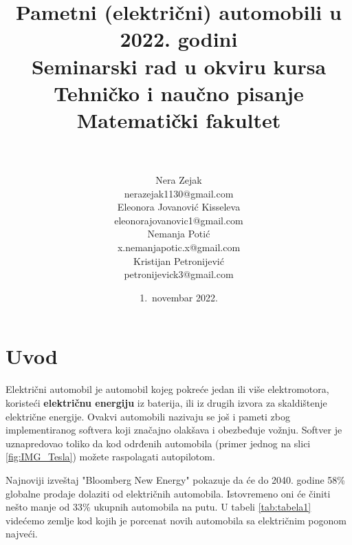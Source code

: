\documentclass[a4paper]{article}
\begin{document}
\title{Pametni (električni) automobili u 2022. godini\vspace{3ex}\\ \small{Seminarski rad u okviru kursa\\Tehničko i naučno pisanje\\ Matematički fakultet}}

\author{\\\\Nera Zejak\\\footnotesize {nerazejak1130@gmail.com}\\Eleonora Jovanović Kisseleva\\\footnotesize {eleonorajovanovic1@gmail.com}\\Nemanja Potić\\\footnotesize {x.nemanjapotic.x@gmail.com}\\Kristijan Petronijević\\\footnotesize {petronijevick3@gmail.com}\\}
\date{1.~novembar 2022.}
\maketitle



\tableofcontents

\newpage

\section{Uvod}
   Električni automobil  je automobil kojeg pokreće jedan ili više elektromotora, koristeći \textbf{električnu energiju} iz baterija, ili iz drugih izvora za skaldištenje električne energije. Ovakvi automobili nazivaju se još i pameti zbog implementiranog softvera koji značajno olakšava i obezbeđuje vožnju. Softver je uznapredovao toliko da kod odrđenih automobila (primer jednog na slici \ref{fig:IMG_Tesla}) možete raspolagati autopilotom.
    
    
Najnoviji izveštaj "Bloomberg New Energy" pokazuje da će do 2040. godine 58\% globalne prodaje dolaziti od električnih automobila. Istovremeno oni će činiti nešto manje od 33\% ukupnih automobila na putu. U tabeli \ref{tab:tabela1} videćemo zemlje kod kojih je porcenat novih automobila sa električnim pogonom najveći.
\end{document}
